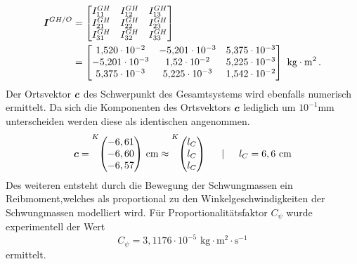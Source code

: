 \begin{equation}
\begin{split}
\boldsymbol{I}^{GH/O} &= \begin{bmatrix}
I^{GH}_{11} & I^{GH}_{12} & I^{GH}_{13} \\
I^{GH}_{21} & I^{GH}_{22} & I^{GH}_{23} \\
I^{GH}_{31} & I^{GH}_{32} & I^{GH}_{33}
\end{bmatrix} \\
&=
\begin{bmatrix}
1{,}520\cdot 10^{-2} & -5{,}201\cdot 10^{-3} & 5{,}375\cdot 10^{-3} \\
-5{,}201\cdot 10^{-3} & 1{,}52\cdot 10^{-2} & 5{,}225\cdot 10^{-3} \\
5{,}375\cdot 10^{-3} & 5{,}225\cdot 10^{-3} & 1{,}542\cdot 10^{-2}
\end{bmatrix}\text{ kg}\cdot \text{m}^2 \,.
\end{split}
\end{equation}
Der Ortsvektor $\boldsymbol{c}$ des Schwerpunkt des Gesamtsystems wird ebenfalls numerisch ermittelt. Da sich die Komponenten des Ortsvektors $\boldsymbol{c}$ lediglich um $10^{-1}\text{mm}$ unterscheiden werden diese als identischen angenommen.
\begin{equation}
\bs{c} = \vecBS{K}{-6,61}{-6,60}{-6,57}\text{ cm} \approx \vecBS{K}{l_C}{l_C}{l_C} \hspace{15pt} \vert \hspace{15pt} l_C = 6,6\text{ cm}
\end{equation}
Des weiteren entsteht durch die Bewegung der Schwungmassen ein Reibmoment,welches als proportional zu den Winkelgeschwindigkeiten der Schwungmassen modelliert wird. Für Proportionalitätsfaktor $C_{\psi}$ wurde experimentell der  Wert 
\begin{equation}
C_{\psi} = 3,1176\cdot 10^{-5}\text{ kg}\cdot \text{m}^2 \cdot \text{s}^{-1}
\end{equation}
ermittelt.